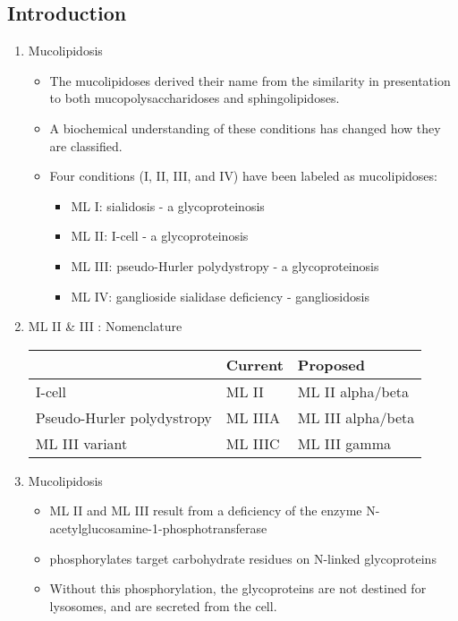 \documentclass{scrartcl}
\begin{document}
\subsection{Introduction}
\label{sec:orga92dab9}
\begin{enumerate}
\item Mucolipidosis
\label{sec:org0950753}
\begin{itemize}
\item The mucolipidoses derived their name from the similarity in
presentation to both mucopolysaccharidoses and sphingolipidoses.

\item A biochemical understanding of these conditions has changed how they
are classified.
\item Four conditions (I, II, III, and IV) have been labeled as
mucolipidoses:
\begin{itemize}
\item ML I: sialidosis - a glycoproteinosis
\item ML II: I-cell - a glycoproteinosis
\item ML III: pseudo-Hurler polydystropy - a glycoproteinosis
\item ML IV: ganglioside sialidase deficiency - gangliosidosis
\end{itemize}
\end{itemize}


\item ML II \& III : Nomenclature
\label{sec:org3a0ffa6}

\begin{center}
\begin{tabular}{lll}
 & Current & Proposed\\
\hline
I-cell & ML II & ML II alpha/beta\\
Pseudo-Hurler polydystropy & ML IIIA & ML III alpha/beta\\
ML III variant & ML IIIC & ML III gamma\\
\end{tabular}
\end{center}

\item Mucolipidosis
\label{sec:orga180444}

\begin{itemize}
\item ML II and ML III result from a deficiency of the enzyme
N-acetylglucosamine-1-phosphotransferase
\item phosphorylates target carbohydrate residues on N-linked
glycoproteins
\item Without this phosphorylation, the glycoproteins are not destined for
lysosomes, and are secreted from the cell.
\end{itemize}
\end{enumerate}
\end{document}

